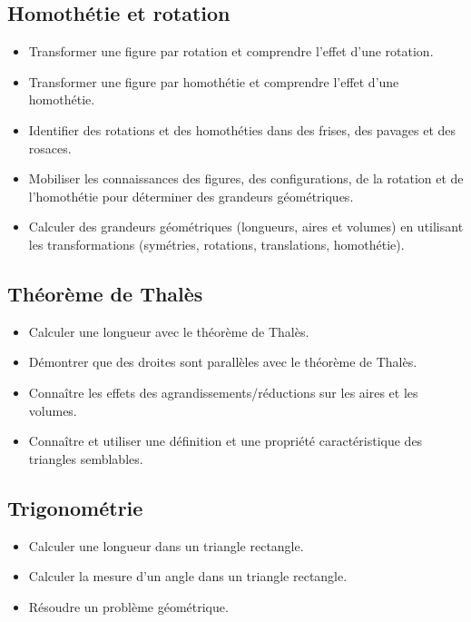 \documentclass[a4paper,12pt,fleqn]{article}
\begin{document}
\renewcommand{\labelitemi}{}

\subsection*{Homothétie et rotation}

\begin{itemize}
	\item {}Transformer une figure par rotation et comprendre l’effet d’une rotation.
	\item {}Transformer une figure par homothétie et comprendre l’effet d’une homothétie.
	\item {}Identifier des rotations et des homothéties dans des frises, des pavages et des rosaces.
	\item {}Mobiliser les connaissances des figures, des configurations, de la rotation et de l’homothétie pour déterminer des grandeurs géométriques.
	\item {}Calculer des grandeurs géométriques (longueurs, aires et volumes) en utilisant les transformations (symétries, rotations, translations, homothétie).

\end{itemize}

\subsection*{Théorème de Thalès}

\begin{itemize}
	\item {}Calculer une longueur avec le théorème de Thalès.
	\item {}Démontrer que des droites sont parallèles avec le théorème de Thalès.
	\item {}Connaître les effets des agrandissements/réductions sur les aires et les volumes.
	\item {}Connaître et utiliser une définition et une propriété caractéristique des triangles semblables.
\end{itemize}

\subsection*{Trigonométrie}

\begin{itemize}
	\item {}Calculer une longueur dans un triangle rectangle.
	\item {}Calculer la mesure d'un angle dans un triangle rectangle.
	\item {}Résoudre un problème géométrique.
\end{itemize}
\end{document}
